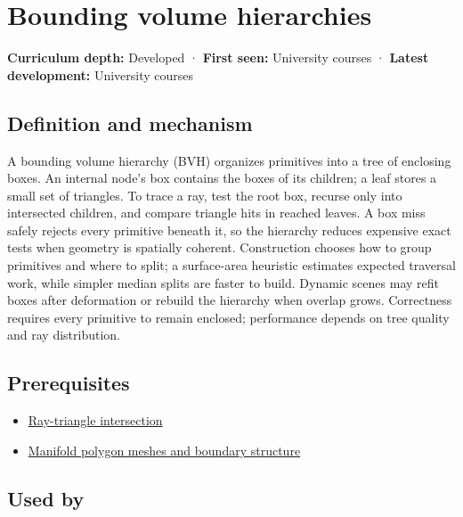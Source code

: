 \hypertarget{appendix-0b426c47dd78}{}\label{referencestart:appendix-0b426c47dd78}
\section{Bounding volume hierarchies}\label{appendix-0b426c47dd78-bounding-volume-hierarchies}

\textbf{Curriculum depth:} Developed · \textbf{First seen:} University courses · \textbf{Latest development:} University courses

\subsection{Definition and mechanism}\label{appendix-0b426c47dd78-definition-and-mechanism}

A bounding volume hierarchy (BVH) organizes primitives into a tree of enclosing boxes. An internal node's box contains the boxes of its children; a leaf stores a small set of triangles. To trace a ray, test the root box, recurse only into intersected children, and compare triangle hits in reached leaves. A box miss safely rejects every primitive beneath it, so the hierarchy reduces expensive exact tests when geometry is spatially coherent. Construction chooses how to group primitives and where to split; a surface-area heuristic estimates expected traversal work, while simpler median splits are faster to build. Dynamic scenes may refit boxes after deformation or rebuild the hierarchy when overlap grows. Correctness requires every primitive to remain enclosed; performance depends on tree quality and ray distribution.

\subsection{Prerequisites}\label{appendix-0b426c47dd78-prerequisites}

\begin{itemize}
\tightlist
\item
  \hyperref[appendix-47ac1bd6d144]{Ray-triangle intersection}
\item
  \hyperref[appendix-fab348609369]{Manifold polygon meshes and boundary structure}
\end{itemize}

\subsection{Used by}\label{appendix-0b426c47dd78-used-by}

